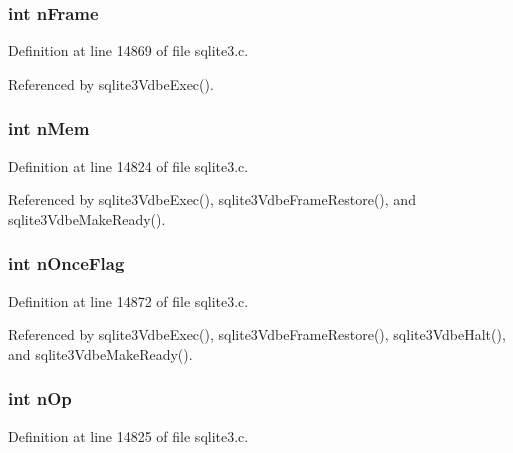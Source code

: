 \subsubsection[{n\+Frame}]{\setlength{\rightskip}{0pt plus 5cm}int n\+Frame}\label{struct_vdbe_af29664edee858108ea51968053f5fc3c}


Definition at line 14869 of file sqlite3.\+c.



Referenced by sqlite3\+Vdbe\+Exec().

\hypertarget{struct_vdbe_a857d199d972b4d3864ce420c143508e4}{}
\subsubsection[{n\+Mem}]{\setlength{\rightskip}{0pt plus 5cm}int n\+Mem}\label{struct_vdbe_a857d199d972b4d3864ce420c143508e4}


Definition at line 14824 of file sqlite3.\+c.



Referenced by sqlite3\+Vdbe\+Exec(), sqlite3\+Vdbe\+Frame\+Restore(), and sqlite3\+Vdbe\+Make\+Ready().

\hypertarget{struct_vdbe_a391dfc763758d272dcce42b2b72826a7}{}
\subsubsection[{n\+Once\+Flag}]{\setlength{\rightskip}{0pt plus 5cm}int n\+Once\+Flag}\label{struct_vdbe_a391dfc763758d272dcce42b2b72826a7}


Definition at line 14872 of file sqlite3.\+c.



Referenced by sqlite3\+Vdbe\+Exec(), sqlite3\+Vdbe\+Frame\+Restore(), sqlite3\+Vdbe\+Halt(), and sqlite3\+Vdbe\+Make\+Ready().

\hypertarget{struct_vdbe_a33625b7205f0da4b73ec34d2d4aefd64}{}
\subsubsection[{n\+Op}]{\setlength{\rightskip}{0pt plus 5cm}int n\+Op}\label{struct_vdbe_a33625b7205f0da4b73ec34d2d4aefd64}


Definition at line 14825 of file sqlite3.\+c.



